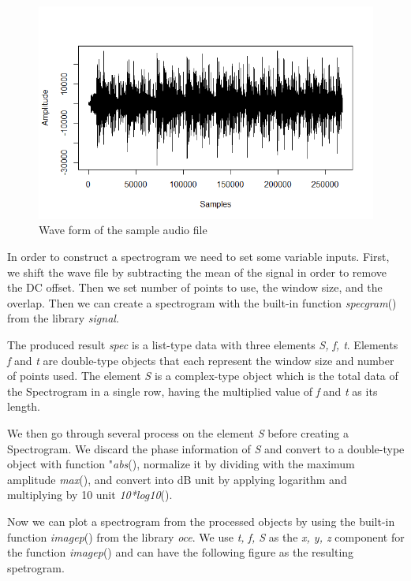 \begin{figure}[H]
    \centering
    \includegraphics[width=12cm]{images/Spectrum/SampleWave.png}
    \caption{Wave form of the sample audio file}
    \label{fig:samplewave} 
\end{figure}

In order to construct a spectrogram we need to set some variable inputs. First, we shift the wave file by subtracting the mean of the signal in order to remove the DC offset. Then we set number of points to use, the window size, and the overlap. Then we can create a spectrogram with the built-in function \emph{specgram}() from the library \emph{signal}. 

The produced result \emph{spec} is a list-type data with three elements \emph{S, f, t}. Elements \emph{f} and \emph{t} are double-type objects that each represent the window size and number of points used. The element \emph{S} is a complex-type object which is the total data of the Spectrogram in a single row, having the multiplied value of \emph{f} and \emph{t} as its length.

We then go through several process on the element \emph{S} before creating a Spectrogram. We discard the phase information of \emph{S} and convert to a double-type object with function "\emph{abs}(), normalize it by dividing with the maximum amplitude \emph{max}(), and convert into dB unit by applying logarithm and multiplying by 10 unit \emph{10*log10}(). 

Now we can plot a spectrogram from the processed objects by using the built-in function \emph{imagep}() from the library \emph{oce}. We use \emph{t, f, S} as the \emph{x, y, z} component for the function \emph{imagep}() and can have the following figure as the resulting spetrogram.

